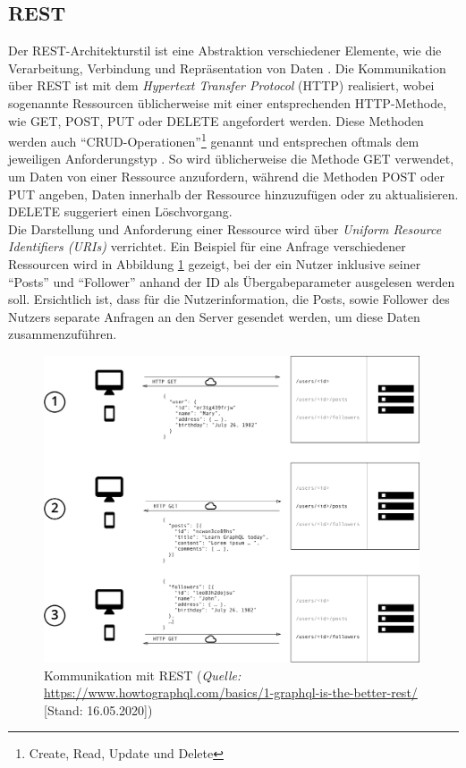 \documentclass[a4paper, 11pt, DIV=11, listof=numbered, numbers=noenddot]{scrartcl}
\begin{document}
	\subsection{REST}\label{ssec:rest}
	Der REST-Architekturstil ist eine Abstraktion verschiedener Elemente, wie die Verarbeitung, Verbindung und Repräsentation von Daten \cite{WebArch}. Die Kommunikation über REST ist mit dem \textit{Hypertext Transfer Protocol} (HTTP) realisiert, wobei sogenannte Ressourcen üblicherweise mit einer entsprechenden HTTP-Methode, wie GET, POST, PUT oder DELETE angefordert werden. Diese Methoden werden auch \enquote{CRUD-Operationen}\footnote{Create, Read, Update und Delete} genannt und entsprechen oftmals dem jeweiligen Anforderungstyp \cite{@CRUD}. So wird üblicherweise die Methode GET verwendet, um Daten von einer Ressource anzufordern, während die Methoden POST oder PUT angeben, Daten innerhalb der Ressource hinzuzufügen oder zu aktualisieren. DELETE suggeriert einen Löschvorgang.\\
	Die Darstellung und Anforderung einer Ressource wird über \textit{Uniform Resource Identifiers (URIs)} \cite{RFC3986} verrichtet. Ein Beispiel für eine Anfrage verschiedener Ressourcen wird in Abbildung \ref{fig:rest} gezeigt, bei der ein Nutzer inklusive seiner \enquote{Posts} und \enquote{Follower} anhand der ID als Übergabeparameter ausgelesen werden soll. Ersichtlich ist, dass für die Nutzerinformation, die Posts, sowie Follower des Nutzers separate Anfragen an den Server gesendet werden, um diese Daten zusammenzuführen.
	\begin{figure}[!htbp]
		\centering
		\includegraphics[width=0.99\textwidth]{img/rest.png}
		\caption{Kommunikation mit REST (\textit{Quelle:} \url{https://www.howtographql.com/basics/1-graphql-is-the-better-rest/} [Stand: 16.05.2020])}\label{fig:rest}
	\end{figure}
\end{document}
